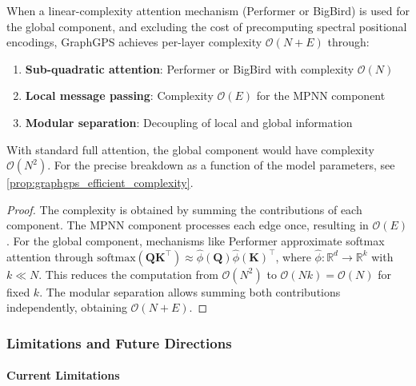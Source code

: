 \begin{proposition}\label{prop:graphgps_scalability}
When a linear-complexity attention mechanism (Performer \citep{choromanski2021performer} or BigBird) is used for the global component, and excluding the cost of precomputing spectral positional encodings, GraphGPS achieves per-layer complexity $\mathcal{O}(N + E)$ through:
\begin{enumerate}
    \item \textbf{Sub-quadratic attention}: Performer or BigBird with complexity $\mathcal{O}(N)$
    \item \textbf{Local message passing}: Complexity $\mathcal{O}(E)$ for the MPNN component
    \item \textbf{Modular separation}: Decoupling of local and global information
\end{enumerate}
With standard full attention, the global component would have complexity $\mathcal{O}(N^2)$. For the precise breakdown as a function of the model parameters, see \autoref{prop:graphgps_efficient_complexity}.
\end{proposition}

\begin{proof}
The complexity is obtained by summing the contributions of each component. The MPNN component processes each edge once, resulting in $\mathcal{O}(E)$. For the global component, mechanisms like Performer approximate softmax attention through $\text{softmax}(\mathbf{Q}\mathbf{K}^\top) \approx \hat{\phi}(\mathbf{Q})\hat{\phi}(\mathbf{K})^\top$, where $\hat{\phi}: \mathbb{R}^d \to \mathbb{R}^k$ with $k \ll N$. This reduces the computation from $\mathcal{O}(N^2)$ to $\mathcal{O}(Nk) = \mathcal{O}(N)$ for fixed $k$. The modular separation allows summing both contributions independently, obtaining $\mathcal{O}(N + E)$.
\end{proof}

\subsubsection{Limitations and Future Directions}\label{subsubsec:limitaciones_gat}

\paragraph{Current Limitations}

